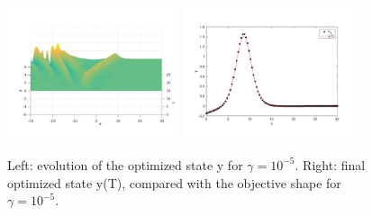 \begin{figure}[!h]
 \includegraphics[width = 0.45\textwidth]{images/ex2state3d.pdf}
 \includegraphics[width = 0.45\textwidth]{images/controlledstate.pdf}
 \caption{Left: evolution of the optimized state y for $\gamma = 10^{-5}$. Right: final optimized state y(T), compared with the objective shape for $\gamma = 10^{-5}$.}
 \label{ex2fullgammadm5}
\end{figure}


\clearpage

